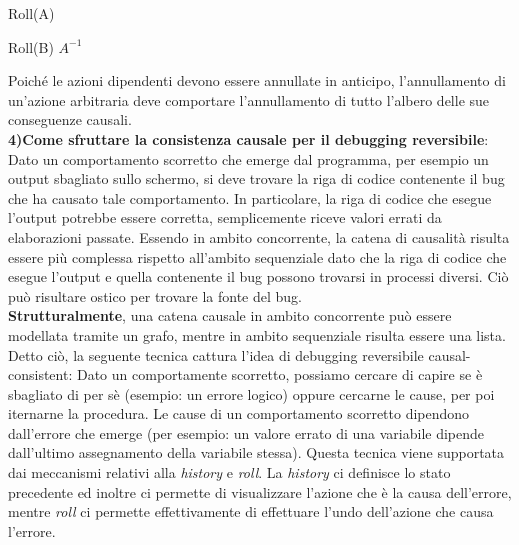 \documentclass[background.tex]{subfiles}
\begin{document}
\begin{algorithm}[H]
\caption{Roll(A)}
\begin{algorithmic} 
		\STATE Roll(B)
	\ENDFOR
	\STATE $A^{-1}$
\end{algorithmic}
\end{algorithm}
Poiché le azioni dipendenti devono essere annullate in anticipo, l'annullamento di un'azione arbitraria deve comportare l'annullamento di tutto l'albero delle sue conseguenze causali.\\
\textbf{4)Come sfruttare la consistenza causale per il debugging reversibile}:\\
Dato un comportamento scorretto che emerge dal programma, per esempio un output sbagliato sullo schermo, si deve trovare la riga di codice contenente il bug che ha causato tale comportamento. In particolare, la riga di codice che esegue l'output potrebbe essere corretta, semplicemente riceve valori errati da elaborazioni passate. Essendo in ambito concorrente, la catena di causalità risulta essere più complessa rispetto all'ambito sequenziale dato che la riga di codice che esegue l'output e quella contenente il bug possono trovarsi in processi diversi. Ciò può risultare ostico per trovare la fonte del bug.\\
\textbf{Strutturalmente}, una catena causale in ambito concorrente può essere modellata tramite un grafo, mentre in ambito sequenziale risulta essere una lista.
Detto ciò, la seguente tecnica cattura l'idea di debugging reversibile causal-consistent:
Dato un comportamente scorretto, possiamo cercare di capire se è sbagliato di per sè (esempio: un errore logico) oppure cercarne le cause, per poi iternarne la procedura. Le cause di un comportamento scorretto dipendono dall'errore che emerge (per esempio: un valore errato di una variabile dipende dall'ultimo assegnamento della variabile stessa).
Questa tecnica viene supportata dai meccanismi relativi alla \textit{history} e \textit{roll}. La \textit{history} ci definisce lo stato precedente ed inoltre ci permette di visualizzare l'azione che è la causa dell'errore, mentre \textit{roll} ci permette effettivamente di effettuare l'undo dell'azione che causa l'errore.
\end{document}
